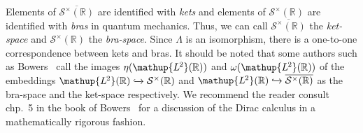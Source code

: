 \documentclass[12pt, a4 paper]{article}
\theoremstyle{definition}
\newcommand{\ltwo}{\mathup{L\kern-0.5pt^2}}
\newcommand{\rr}{\mathbb{R}}
\newcommand{\cc}{\mathbb{C}}
\newcommand{\dirac}{\delta}
\newcommand{\ltwor}{\ltwo(\rr)}
\newcommand{\schwartz}{\mathcal{S}}
\newcommand{\schwartzr}{\schwartz(\rr)}
\newcommand{\dist}{\schwartz^\times}
\newcommand{\distr}{\dist(\rr)}
\newcommand{\anti}{\overline{\distr}}
\newcommand{\identity}{\mathrm{id}}
\begin{document}
	Elements of $\anti$ are identified with \textit{kets} and elements of $\distr$ are identified with \textit{bras} in quantum mechanics. Thus, we can call $\anti$ the \textit{ket-space} and $\distr$ the \textit{bra-space}. Since $\Lambda$ is an isomorphism, there is a one-to-one correspondence between kets and bras. It should be noted that some authors such as Bowers~\cite[chp.~5]{Bowers} call the images $\eta(\ltwor)$ and $\omega(\ltwor)$ of the embeddings $\ltwor \xhookrightarrow{} \distr$ and $\ltwor \xhookrightarrow{} \anti$ as the bra-space and the ket-space respectively. We recommend the reader consult chp.~5 in the book of Bowers~\cite{Bowers} for a discussion of the Dirac calculus in a mathematically rigorous fashion.

\end{document}
